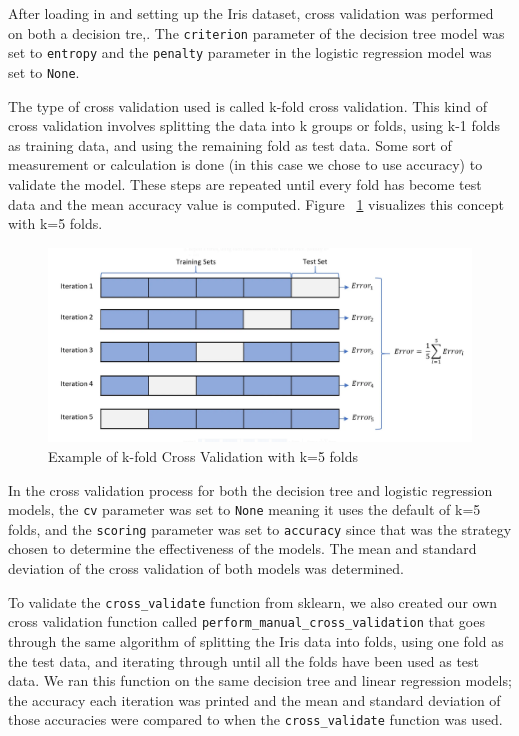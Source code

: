 \documentclass[journal]{IEEEtran}
\begin{document}
After loading in and setting up the Iris dataset, cross validation was performed on both a decision tre\cite{b2},\cite{b3}. The \lstinline{criterion} parameter of the decision tree model was set to \lstinline{entropy} and the \lstinline{penalty} parameter in the logistic regression model was set to \lstinline{None}.

The type of cross validation used is called k-fold cross validation. This kind of cross validation involves splitting the data into k groups or folds, using k-1 folds as training data, and using the remaining fold as test data. Some sort of measurement or calculation is done (in this case we chose to use accuracy) to validate the model. These steps are repeated until every fold has become test data and the mean accuracy value is computed. Figure ~\ref{fig:kfoldCV} visualizes this concept with k=5 folds.

\begin{figure}[h!]
\includegraphics[scale=0.18]{5foldCV.png}
\centering
\caption{Example of k-fold Cross Validation with k=5 folds \cite{b4}}
\label{fig:kfoldCV}
\end{figure}

\newpage

In the cross validation process for both the decision tree and logistic regression models, the \lstinline{cv} parameter was set to \lstinline{None} meaning it uses the default of k=5 folds, and the \lstinline{scoring} parameter was set to \lstinline{accuracy} since that was the strategy chosen to determine the effectiveness of the models. The mean and standard deviation of the cross validation of both models was determined. 

To validate the \lstinline{cross_validate} function from sklearn, we also created our own cross validation function called \lstinline{perform_manual_cross_validation} that goes through the same algorithm of splitting the Iris data into folds, using one fold as the test data, and iterating through until all the folds have been used as test data. We ran this function on the same decision tree and linear regression models; the accuracy each iteration was printed and the mean and standard deviation of those accuracies were compared to when the \lstinline{cross_validate} function was used. 
\end{document}
